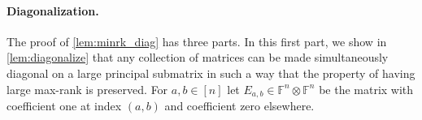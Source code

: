 \documentclass{daj}
\newcommand{\FF}{\mathbb{F}}
\newcommand{\NN}{\mathbb{N}}
\newcommand{\eps}{\varepsilon}
\DeclareMathOperator{\rank}{rank} \DeclareMathOperator{\col}{colspan}
\newcommand{\id}{\mathrm{Id}}
\begin{document}





\paragraph{Diagonalization.}
The proof of \autoref{lem:minrk_diag} has three parts.
In this first part, we show in \autoref{lem:diagonalize} that any collection of matrices can be made simultaneously diagonal on a large principal submatrix in such a way that the property of having large max-rank is preserved. 
For $a,b \in [n]$ let $E_{a,b} \in \FF^n \otimes \FF^n$ be the matrix with coefficient one at index $(a,b)$ and coefficient zero elsewhere.
\end{document}
